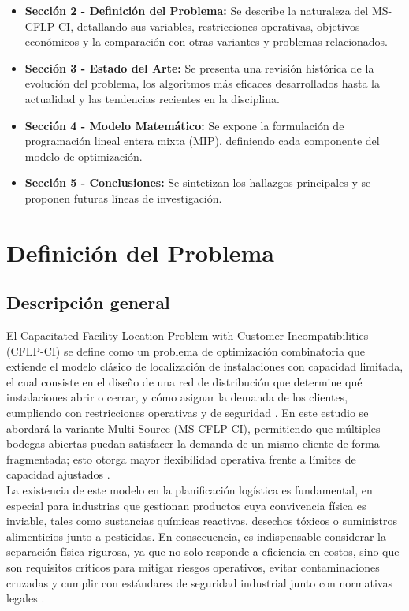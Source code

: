 \documentclass[letter, 10pt]{article}
\begin{document}
\begin{itemize}
    \item \textbf{Sección 2 - Definición del Problema:} Se describe la naturaleza del MS-CFLP-CI, detallando sus variables, restricciones operativas, objetivos económicos y la comparación con otras variantes y problemas relacionados.
    \item \textbf{Sección 3 - Estado del Arte:} Se presenta una revisión histórica de la evolución del problema, los algoritmos más eficaces desarrollados hasta la actualidad y las tendencias recientes en la disciplina.
    \item \textbf{Sección 4 - Modelo Matemático:} Se expone la formulación de programación lineal entera mixta (MIP), definiendo cada componente del modelo de optimización.
    \item \textbf{Sección 5 - Conclusiones:} Se sintetizan los hallazgos principales y se proponen futuras líneas de investigación.
\end{itemize}

\section{Definición del Problema}

\subsection{Descripción general}
El Capacitated Facility Location Problem with Customer Incompatibilities (CFLP-CI) se define como un problema de optimización combinatoria que extiende el modelo clásico de localización de instalaciones con capacidad limitada, el cual consiste en el diseño de una red de distribución que determine qué instalaciones abrir o cerrar, y cómo asignar la demanda de los clientes, cumpliendo con restricciones operativas y de seguridad \cite{ceschia2024}. En este estudio se abordará la variante Multi-Source (MS-CFLP-CI), permitiendo que múltiples bodegas abiertas puedan satisfacer la demanda de un mismo cliente de forma fragmentada; esto otorga mayor flexibilidad operativa frente a límites de capacidad ajustados \cite{Maia2023}.\\

La existencia de este modelo en la planificación logística es fundamental, en especial para industrias que gestionan productos cuya convivencia física es inviable, tales como sustancias químicas reactivas, desechos tóxicos o suministros alimenticios junto a pesticidas. En consecuencia, es indispensable considerar la separación física rigurosa, ya que no solo responde a eficiencia en costos, sino que son requisitos críticos para mitigar riesgos operativos, evitar contaminaciones cruzadas y cumplir con estándares de seguridad industrial junto con normativas legales \cite{Gjergji2025}.
\end{document}
